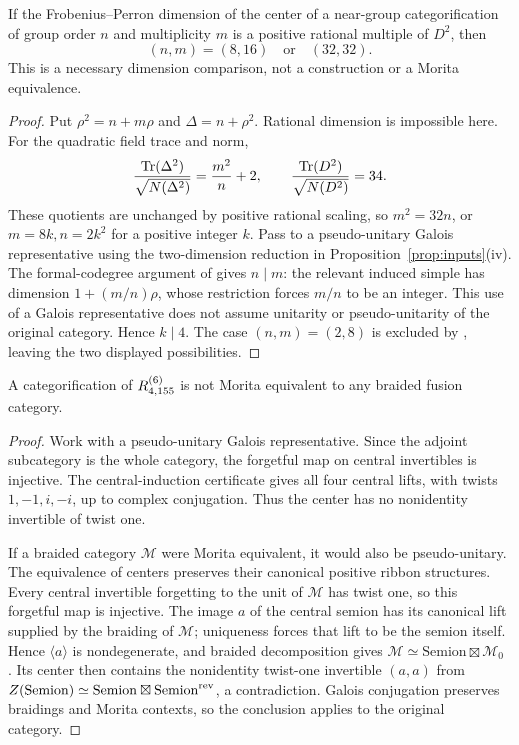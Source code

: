\begin{proposition}
\label{prop:155-neargroup-dimensions}
If the Frobenius--Perron dimension of the center of a near-group
categorification of group order $n$ and multiplicity $m$ is a positive
rational multiple of $D^2$, then
\[
 (n,m)=(8,16)\quad\text{or}\quad(32,32).
\]
This is a necessary dimension comparison, not a construction or a
Morita equivalence.
\end{proposition}
\begin{proof}
Put $\rho^2=n+m\rho$ and $\Delta=n+\rho^2$. Rational dimension is
impossible here. For the quadratic field trace and norm,
\[
 \frac{\operatorname{Tr}(\Delta^2)}{\sqrt{N(\Delta^2)}}
   =\frac{m^2}{n}+2,
 \qquad
 \frac{\operatorname{Tr}(D^2)}{\sqrt{N(D^2)}}=34.
\]
These quotients are unchanged by positive rational scaling, so
$m^2=32n$, or $m=8k,n=2k^2$ for a positive integer $k$.
Pass to a pseudo-unitary Galois representative using the two-dimension
reduction in Proposition~\ref{prop:inputs}(iv).
The formal-codegree argument of \cite[Proposition~3.3]{SchTwo} gives
$n\mid m$: the relevant induced simple has dimension
$1+(m/n)\rho$, whose restriction forces $m/n$ to be an integer.
This use of a Galois representative does not assume unitarity or
pseudo-unitarity of the original category. Hence $k\mid4$.
The case $(n,m)=(2,8)$ is excluded by
\cite[Theorem~1.1]{SchTwo}, leaving the two displayed possibilities.
\end{proof}


\begin{proposition}
\label{prop:155-no-braided-morita}
A categorification of $R^{(6)}_{4,155}$ is not Morita equivalent to any
braided fusion category.
\end{proposition}
\begin{proof}
Work with a pseudo-unitary Galois representative. Since the adjoint
subcategory is the whole category, the forgetful map on central
invertibles is injective. The central-induction certificate gives all four
central lifts, with twists $1,-1,i,-i$, up to complex conjugation.
Thus the center has no nonidentity invertible of twist one.

If a braided category $\mathcal M$ were Morita equivalent, it would
also be pseudo-unitary. The equivalence of centers preserves their
canonical positive ribbon structures. Every central invertible
forgetting to the unit of $\mathcal M$ has twist one, so this
forgetful map is injective. The image $a$ of the central semion has
its canonical lift supplied by the braiding of $\mathcal M$; uniqueness
forces that lift to be the semion itself. Hence $\langle a\rangle$
is nondegenerate, and braided decomposition gives
$\mathcal M\simeq\mathrm{Semion}\boxtimes\mathcal M_0$
\cite{DGNO}. Its center then contains the nonidentity twist-one
invertible $(a,a)$ from
$Z(\mathrm{Semion})\simeq\mathrm{Semion}\boxtimes\mathrm{Semion}^{\rm rev}$,
a contradiction. Galois conjugation preserves braidings and Morita
contexts, so the conclusion applies to the original category.
\end{proof}

